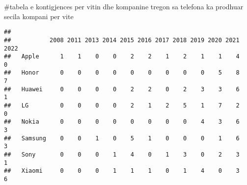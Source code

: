 \documentclass[
]{article}
\newenvironment{Shaded}{\begin{snugshade}}{\end{snugshade}}
\newcommand{\AttributeTok}[1]{\textcolor[rgb]{0.77,0.63,0.00}{#1}}
\newcommand{\CommentTok}[1]{\textcolor[rgb]{0.56,0.35,0.01}{\textit{#1}}}
\newcommand{\FunctionTok}[1]{\textcolor[rgb]{0.00,0.00,0.00}{#1}}
\newcommand{\NormalTok}[1]{#1}
\newcommand{\OtherTok}[1]{\textcolor[rgb]{0.56,0.35,0.01}{#1}}
\newcommand{\SpecialCharTok}[1]{\textcolor[rgb]{0.00,0.00,0.00}{#1}}
\newcommand{\StringTok}[1]{\textcolor[rgb]{0.31,0.60,0.02}{#1}}
\begin{document}
\#tabela e kontigjences per vitin dhe kompanine tregon sa telefona ka
prodhuar secila kompani per vite

\begin{Shaded}
\end{Shaded}

\begin{verbatim}
##          
##           2008 2011 2013 2014 2015 2016 2017 2018 2019 2020 2021 2022
##   Apple      1    1    0    0    2    2    1    2    1    1    4    0
##   Honor      0    0    0    0    0    0    0    0    0    5    8    7
##   Huawei     0    0    0    0    2    2    0    2    3    3    6    1
##   LG         0    0    0    0    2    1    2    5    1    7    2    0
##   Nokia      0    0    0    0    0    0    0    0    4    3    6    3
##   Samsung    0    0    1    0    5    1    0    0    0    1    6    3
##   Sony       0    0    0    1    4    0    1    3    0    2    3    1
##   Xiaomi     0    0    0    1    1    1    0    1    4    0    3    6
\end{verbatim}

\begin{Shaded}
\end{Shaded}
\end{document}

